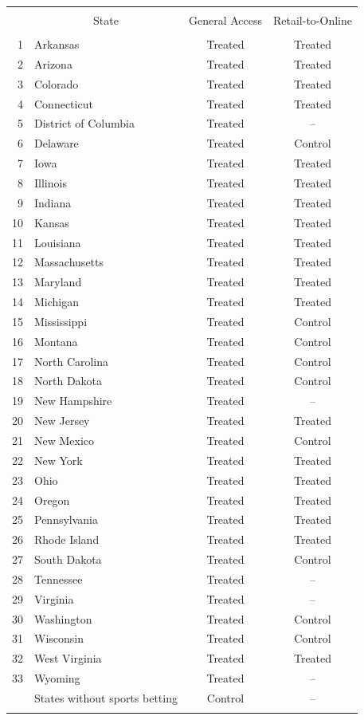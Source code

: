 \begin{tabular}{@{\extracolsep{5pt}} rlcc} 
\\[-1.8ex]\hline 
\hline \\[-1.8ex] 
& \multicolumn{1}{c}{State} & General Access & Retail-to-Online\\ 
\hline \\[-1.8ex] 
1 & Arkansas & Treated & Treated \\ 
2 & Arizona & Treated & Treated \\ 
3 & Colorado & Treated & Treated \\ 
4 & Connecticut & Treated & Treated \\ 
5 & District of Columbia & Treated & -- \\ 
6 & Delaware & Treated & Control \\ 
7 & Iowa & Treated & Treated \\ 
8 & Illinois & Treated & Treated \\ 
9 & Indiana & Treated & Treated \\ 
10 & Kansas & Treated & Treated \\ 
11 & Louisiana & Treated & Treated \\ 
12 & Massachusetts & Treated & Treated \\ 
13 & Maryland & Treated & Treated \\ 
14 & Michigan & Treated & Treated \\ 
15 & Mississippi & Treated & Control \\ 
16 & Montana & Treated & Control \\ 
17 & North Carolina & Treated & Control \\ 
18 & North Dakota & Treated & Control \\ 
19 & New Hampshire & Treated & -- \\ 
20 & New Jersey & Treated & Treated \\ 
21 & New Mexico & Treated & Control \\ 
22 & New York & Treated & Treated \\ 
23 & Ohio & Treated & Treated \\ 
24 & Oregon & Treated & Treated \\ 
25 & Pennsylvania & Treated & Treated \\ 
26 & Rhode Island & Treated & Treated \\ 
27 & South Dakota & Treated & Control \\ 
28 & Tennessee & Treated & -- \\ 
29 & Virginia & Treated & -- \\ 
30 & Washington & Treated & Control \\ 
31 & Wisconsin & Treated & Control \\ 
32 & West Virginia & Treated & Treated \\ 
33 & Wyoming & Treated & -- \\
 & States without sports betting & Control & -- \\
\hline \\[-1.8ex] 
\end{tabular}
